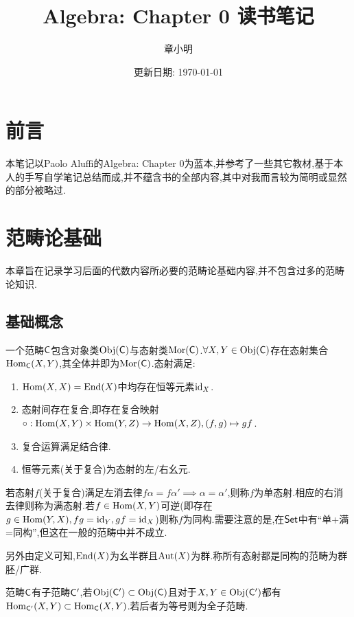 \documentclass[11pt]{article} %
\title{Algebra: Chapter 0 读书笔记}
\author{章小明}
\date{更新日期: \today}
\begin{document}
\maketitle
\tableofcontents

\newpage
\section*{前言}
本笔记以Paolo Aluffi的Algebra: Chapter 0为蓝本,并参考了一些其它教材,基于本人的手写自学笔记总结而成,并不蕴含书的全部内容,其中对我而言较为简明或显然的部分被略过.

\setcounter{section}{-1}
\section{范畴论基础}
本章旨在记录学习后面的代数内容所必要的范畴论基础内容,并不包含过多的范畴论知识.


\subsection{基础概念}
一个范畴$\mathsf{C}$包含对象类$\mathrm{Obj}(\mathsf{C})$与态射类$\mathrm{Mor}(\mathsf{C})$.$\forall X,Y\in\mathrm{Obj}(\mathsf{C})$存在态射集合$\operatorname{Hom}_{\mathsf{C}}(X,Y)$,其全体并即为$\mathrm{Mor}(\mathsf{C})$.态射满足:
\begin{enumerate}[label=(\arabic*)]
    \item $\operatorname{Hom}(X,X)=\operatorname{End}(X)$中均存在恒等元素$\mathrm{id}_X$.
    \item 态射间存在复合,即存在复合映射$\circ:\operatorname{Hom}(X,Y)\times\operatorname{Hom}(Y,Z)\to\operatorname{Hom}(X,Z), (f,g)\mapsto gf$.
    \item 复合运算满足结合律.
    \item 恒等元素(关于复合)为态射的左/右幺元.
\end{enumerate}

若态射$f$(关于复合)满足左消去律$f\alpha=f\alpha'\implies \alpha=\alpha'$,则称$f$为单态射.相应的右消去律则称为满态射.若$f\in\operatorname{Hom}(X,Y)$可逆(即存在$g\in\operatorname{Hom}(Y,X), fg=\mathrm{id}_Y, gf=\mathrm{id}_X$)则称$f$为同构.需要注意的是,在$\mathsf{Set}$中有``单+满=同构'',但这在一般的范畴中并不成立.

另外由定义可知,$\operatorname{End}(X)$为幺半群且$\operatorname{Aut}(X)$为群.称所有态射都是同构的范畴为群胚/广群.

范畴$\mathsf{C}$有子范畴$\mathsf{C}'$,若$\mathrm{Obj}(\mathsf{C}')\subset\mathrm{Obj}(\mathsf{C})$且对于$X,Y\in\mathrm{Obj}(\mathsf{C}')$都有$\operatorname{Hom}_{\mathsf{C}'}(X,Y)\subset\operatorname{Hom}_{\mathsf{C}}(X,Y)$.若后者为等号则为全子范畴.
\end{document}
